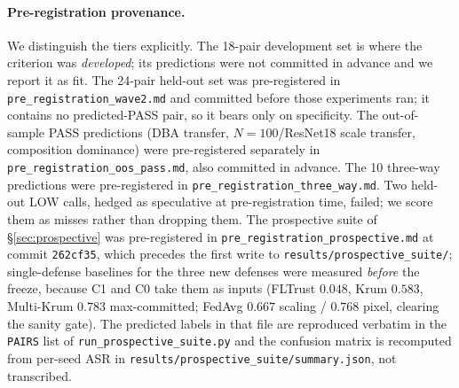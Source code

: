 \documentclass{article}
\begin{document}
\paragraph{Pre-registration provenance.} We distinguish the tiers explicitly. The 18-pair development set is where the criterion was \emph{developed}; its predictions were not committed in advance and we report it as fit. The 24-pair held-out set was pre-registered in \texttt{pre\_registration\_wave2.md} and committed before those experiments ran; it contains no predicted-PASS pair, so it bears only on specificity. The out-of-sample PASS predictions (DBA transfer, $N{=}100$/ResNet18 scale transfer, composition dominance) were pre-registered separately in \texttt{pre\_registration\_oos\_pass.md}, also committed in advance. The 10 three-way predictions were pre-registered in \texttt{pre\_registration\_three\_way.md}. Two held-out LOW calls, hedged as speculative at pre-registration time, failed; we score them as misses rather than dropping them. The prospective suite of \S\ref{sec:prospective} was pre-registered in \texttt{pre\_registration\_prospective.md} at commit \texttt{262cf35}, which precedes the first write to \texttt{results/prospective\_suite/}; single-defense baselines for the three new defenses were measured \emph{before} the freeze, because C1 and C0 take them as inputs (FLTrust $0.048$, Krum $0.583$, Multi-Krum $0.783$ max-committed; FedAvg $0.667$ scaling / $0.768$ pixel, clearing the sanity gate). The predicted labels in that file are reproduced verbatim in the \texttt{PAIRS} list of \texttt{run\_prospective\_suite.py} and the confusion matrix is recomputed from per-seed ASR in \texttt{results/prospective\_suite/summary.json}, not transcribed.
\end{document}
